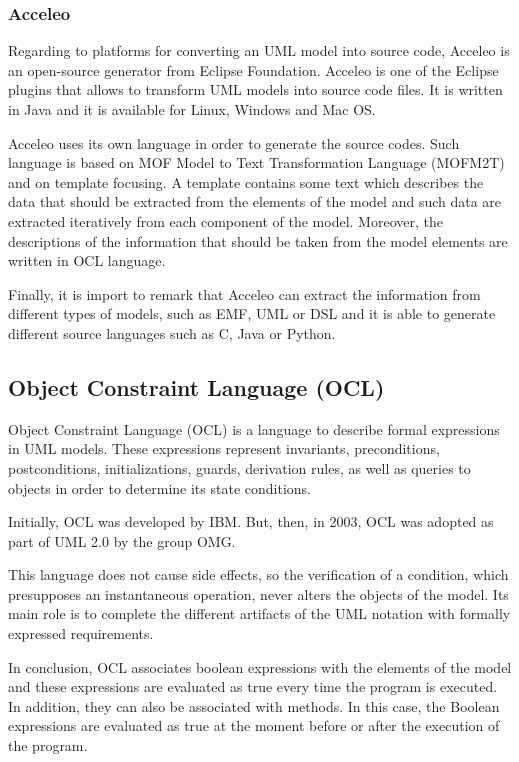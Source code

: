 \subsubsection*{Acceleo}

Regarding to platforms for converting an UML model into source code, Acceleo is an open-source generator from Eclipse Foundation. Acceleo is
one of the Eclipse plugins that allows to transform UML models into source code files. It is written in Java and it is available for Linux, Windows and Mac OS.

Acceleo uses its own language in order to generate the source codes. Such language is based on MOF Model to Text Transformation Language (MOFM2T) and on template focusing. A template contains some text which describes the data that should be extracted from the elements of the model and such data are extracted iteratively from each component of the model. Moreover, the descriptions of the information that should be taken from the model elements are written in OCL language.

Finally, it is import to remark that Acceleo can extract the information from different types of models, such as EMF, UML or DSL and it is able to generate different source languages such as C, Java or Python.

\subsection{Object Constraint Language (OCL)}

Object Constraint Language (OCL) is a language to describe formal expressions in UML models. These expressions represent invariants, preconditions, postconditions, initializations, guards, derivation rules, as well as queries to objects in order to determine its state conditions. 

Initially, OCL was developed by IBM. But, then, in 2003, OCL was adopted as part of UML 2.0 by the group OMG.

This language does not cause side effects, so the verification of a condition, which presupposes an instantaneous operation, never alters the objects of the model. Its main role is to complete the different artifacts of the UML notation with formally expressed requirements.

In conclusion, OCL associates boolean expressions with the elements of the model and these expressions are evaluated as true every time the program is executed. In addition, they can also be associated with methods. In this case, the Boolean expressions are evaluated as true at the moment before or after the execution of the program.
















